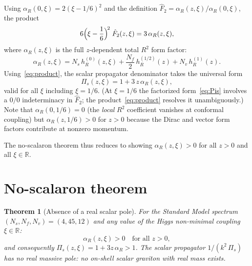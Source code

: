 \documentclass[12pt,a4paper]{article}
\newtheorem{theorem}{Theorem}
\newcommand{\Pis}{\Pi_{s}}
\newcommand{\alphaR}{\alpha_R}
\begin{document}
Using $\alphaR(0,\xi) = 2(\xi - 1/6)^2$ and the definition
$\hat{F}_2 = \alphaR(z,\xi)/\alphaR(0,\xi)$, the product
\begin{equation}\label{eq:product}
  6\Bigl(\xi - \frac{1}{6}\Bigr)^{\!2}\;\hat{F}_2(z,\xi)
  = 3\,\alphaR(z,\xi),
\end{equation}
where $\alphaR(z,\xi)$ is the full $z$-dependent total $R^2$ form factor:
\begin{equation}\label{eq:alphaR}
  \alphaR(z,\xi) = N_s\,h_R^{(0)}(z,\xi)
    + \frac{N_f}{2}\,h_R^{(1/2)}(z)
    + N_v\,h_R^{(1)}(z).
\end{equation}
Using~\eqref{eq:product}, the scalar propagator denominator takes
the universal form
\begin{equation}\label{eq:Pis-reformulated}
  \boxed{\Pis(z,\xi) = 1 + 3\,z\,\alphaR(z,\xi),}
\end{equation}
valid for all $\xi$ including $\xi = 1/6$. (At $\xi = 1/6$ the
factorized form~\eqref{eq:Pis} involves a $0/0$ indeterminacy in
$\hat{F}_2$; the product~\eqref{eq:product} resolves it
unambiguously.) Note that $\alphaR(0, 1/6) = 0$ (the \emph{local}
$R^2$ coefficient vanishes at conformal coupling) but
$\alphaR(z, 1/6) > 0$ for $z > 0$ because the Dirac and vector
form factors contribute at nonzero momentum.

The no-scalaron theorem thus reduces to showing
$\alphaR(z,\xi) > 0$ for all $z > 0$ and all $\xi \in \mathbb{R}$.


\section{No-scalaron theorem}
\label{sec:theorem}

\begin{theorem}[Absence of a real scalar pole]
\label{thm:no-scalaron}
For the Standard Model spectrum $(N_s, N_f, N_v) = (4, 45, 12)$
and any value of the Higgs non-minimal coupling $\xi \in \mathbb{R}$:
\begin{equation}
  \alphaR(z,\xi) > 0 \quad \text{for all } z > 0,
\end{equation}
and consequently $\Pis(z,\xi) = 1 + 3z\,\alphaR > 1$.
The scalar propagator $1/(k^2\,\Pis)$ has no real massive pole:
no on-shell scalar graviton with real mass exists.
\end{theorem}
\end{document}
